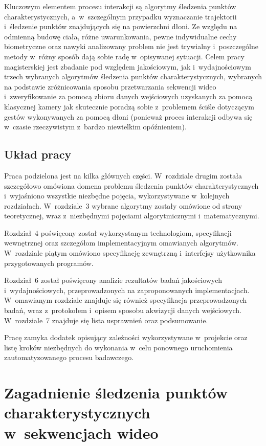     Kluczowym elementem procesu interakcji są algorytmy śledzenia punktów charakterystycznych, a~w~szczególnym przypadku wyznaczanie trajektorii i~śledzenie punktów znajdujących się na powierzchni dłoni. Ze względu na odmienną budowę ciała, różne uwarunkowania, pewne indywidualne cechy biometryczne oraz nawyki analizowany problem nie jest trywialny i~poszczególne metody w~różny sposób dają sobie radę w~opisywanej sytuacji. Celem pracy magisterskiej jest zbadanie pod względem jakościowym, jak i~wydajnościowym trzech wybranych algorytmów śledzenia punktów charakterystycznych, wybranych na podstawie zróżnicowania sposobu przetwarzania sekwencji wideo i~zweryfikowanie za pomocą zbioru danych wejściowych uzyskanych za pomocą klasycznej kamery jak skutecznie poradzą sobie z~problemem ściśle dotyczącym gestów wykonywanych za pomocą dłoni (ponieważ proces interakcji odbywa się w~czasie rzeczywistym z~bardzo niewielkim opóźnieniem).

  \section{Układ pracy}\label{Section_Layout}

    Praca podzielona jest na kilka głównych części. W~rozdziale drugim została szczegółowo omówiona domena problemu śledzenia punktów charakterystycznych i~wyjaśniono wszystkie niezbędne pojęcia, wykorzystywane w~kolejnych rozdziałach. W~rozdziale~3 wybrane algorytmy zostały omówione od strony teoretycznej, wraz z~niezbędnymi pojęciami algorytmicznymi i~matematycznymi.

    Rozdział~4 poświęcony został wykorzystanym technologiom, specyfikacji wewnętrznej oraz szczegółom implementacyjnym omawianych algorytmów. W~rozdziale piątym omówiono specyfikację zewnętrzną i~interfejsy użytkownika przygotowanych programów.

    Rozdział~6 został poświęcony analizie rezultatów badań jakościowych i~wydajnościowych, przeprowadzonych na zaproponowanych implementacjach. W~omawianym rozdziale znajduje się również specyfikacja przeprowadzonych badań, wraz z~protokołem i~opisem sposobu akwizycji danych wejściowych. W~rozdziale~7 znajduje się lista usprawnień oraz podsumowanie.

    Pracę zamyka dodatek opisujący zależności wykorzystywane w~projekcie oraz listę kroków niezbędnych do wykonania w~celu ponownego uruchomienia zautomatyzowanego procesu badawczego.

\chapter{Zagadnienie śledzenia punktów charakterystycznych w~sekwencjach wideo}\label{Chapter_TrackingDomain}

